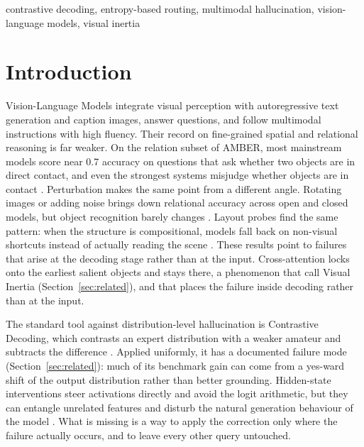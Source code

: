 \documentclass{ieeeaccess}
\begin{document}
\begin{keywords}
contrastive decoding, entropy-based routing, multimodal hallucination, vision-language models, visual inertia
\end{keywords}

\titlepgskip=-21pt

\maketitle

\section{Introduction}\label{sec:intro}

 Vision-Language Models integrate visual perception with autoregressive text generation \cite{liu2023visual} and caption images, answer questions, and follow multimodal instructions with high fluency. Their record on fine-grained spatial and relational reasoning is far weaker. On the relation subset of AMBER, most mainstream models score near 0.7 accuracy on questions that ask whether two objects are in direct contact, and even the strongest systems misjudge whether objects are in contact \cite{wang2023amber}. Perturbation makes the same point from a different angle. Rotating images or adding noise brings down relational accuracy across open and closed models, but object recognition barely changes \cite{shin2026when}. Layout probes find the same pattern: when the structure is compositional, models fall back on non-visual shortcuts instead of actually reading the scene \cite{brown2025hallucination}. These results point to failures that arise at the decoding stage rather than at the input. Cross-attention locks onto the earliest salient objects and stays there, a phenomenon that \cite{gong2026attention} call Visual Inertia (Section~\ref{sec:related}), and that places the failure inside decoding rather than at the input.

The standard tool against distribution-level hallucination is Contrastive Decoding, which contrasts an expert distribution with a weaker amateur and subtracts the difference \cite{leng2024mitigating}. Applied uniformly, it has a documented failure mode (Section~\ref{sec:related}): much of its benchmark gain can come from a yes-ward shift of the output distribution rather than better grounding. Hidden-state interventions steer activations directly and avoid the logit arithmetic, but they can entangle unrelated features and disturb the natural generation behaviour of the model \cite{su2025activation,zhang2026mitigating}. What is missing is a way to apply the correction only where the failure actually occurs, and to leave every other query untouched.
\end{document}
